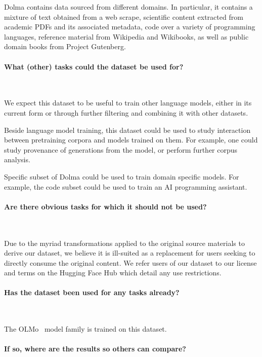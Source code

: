 \documentclass{article}
\newcommand{\dolma}{Dolma\xspace}
\newcommand{\olmo}{OLMo\xspace}
\begin{document}
\dolma contains data sourced from different domains. In particular, it contains a mixture of text obtained from a web scrape, scientific content extracted from academic PDFs and its associated metadata, code over a variety of programming languages, reference material from Wikipedia and Wikibooks, as well as public domain books from Project Gutenberg.

\paragraph{What (other) tasks could the dataset be used for?}~

We expect this dataset to be useful to train other language models, either in its current form or through further filtering and combining it with other datasets. 

Beside language model training, this dataset could be used to study interaction between pretraining corpora and models trained on them. For example, one could study provenance of generations from the model, or perform further corpus analysis. 

Specific subset of \dolma could be used to train domain specific models. For example, the code subset could be used to train an AI programming assistant. 

\paragraph{Are there obvious tasks for which it should not be used?}~

Due to the myriad transformations applied to the original source materials to derive our dataset, we believe it is ill-suited as a replacement for users seeking to directly consume the original content. 
We refer users of our dataset to our license and terms on the Hugging Face Hub \href{https://huggingface.co/datasets/allenai/dolma}{} which detail any use restrictions.

\paragraph{Has the dataset been used for any tasks already?}~

The \olmo~\citep{olmo20247b} model family is trained on this dataset. 

\paragraph{If so, where are the results so others can compare?}~
\end{document}
